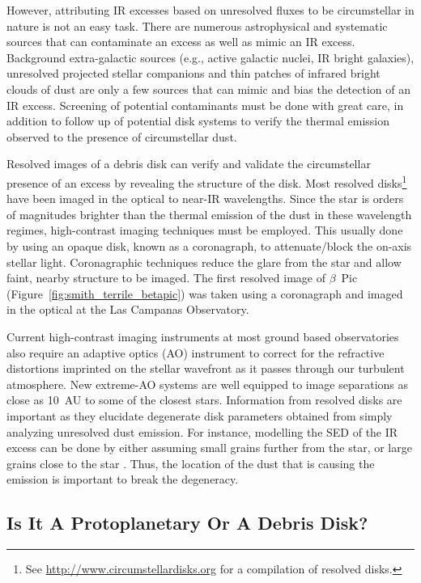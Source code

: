         However, attributing IR excesses based on unresolved fluxes to be circumstellar in nature is not an easy task. There are numerous astrophysical and systematic sources that can contaminate an excess as well as mimic an IR excess. Background extra-galactic sources (e.g., active galactic nuclei, IR bright galaxies), unresolved projected stellar companions and thin patches of infrared bright clouds of dust are only a few sources that can mimic and bias the detection of an IR excess. Screening of potential contaminants must be done with great care, in addition to follow up of potential disk systems to verify the thermal emission observed to the presence of circumstellar dust.
        
    Resolved images of a debris disk can verify and validate the circumstellar presence of an excess by revealing the structure of the disk. Most resolved disks\footnote{See \url{http://www.circumstellardisks.org} for a compilation of resolved disks.} have been imaged in the optical to near-IR wavelengths. Since the star is orders of magnitudes brighter than the thermal emission of the dust in these wavelength regimes, high-contrast imaging techniques must be employed. This usually done by using an opaque disk, known as a coronagraph, to attenuate/block the on-axis stellar light. Coronagraphic techniques reduce the glare from the star and allow faint, nearby structure to be imaged. The first resolved image of $\beta$~Pic (Figure~\ref{fig:smith_terrile_betapic}) was taken using a coronagraph and imaged in the optical at the Las Campanas Observatory.
        
    Current high-contrast imaging instruments at most ground based observatories also require an adaptive optics (AO) instrument to correct for the refractive distortions imprinted on the stellar wavefront as it passes through our turbulent atmosphere. New extreme-AO systems \citet[e.g., Gemini Planet Imager,][]{Macintosh2006} are well equipped to image separations as close as 10~AU to some of the closest stars. Information from resolved disks are important as they elucidate degenerate disk parameters obtained from simply analyzing unresolved dust emission. For instance, modelling the SED of the IR excess can be done by either assuming small grains further from the star, or large grains close to the star \citep{Krivov2010}. Thus, the location of the dust that is causing the emission is important to break the degeneracy\citep[e.g., Figure 13][]{Su2006}. 
        
        
    \subsection{Is It A Protoplanetary Or A Debris Disk?}
    
